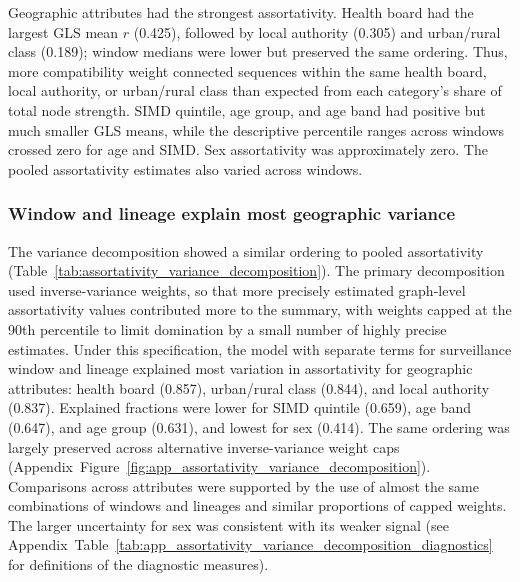 Geographic attributes had the strongest assortativity. Health board had the largest GLS mean $r$ (0.425), followed by local authority (0.305) and urban/rural class (0.189); window medians were lower but preserved the same ordering. Thus, more compatibility weight connected sequences within the same health board, local authority, or urban/rural class than expected from each category's share of total node strength. SIMD quintile, age group, and age band had positive but much smaller GLS means, while the descriptive percentile ranges across windows crossed zero for age and SIMD. Sex assortativity was approximately zero. The pooled assortativity estimates also varied across windows.

\subsubsection*{Window and lineage explain most geographic variance}\label{sec:ch4_variance_decomposition}

The variance decomposition showed a similar ordering to pooled assortativity (Table~\ref{tab:assortativity_variance_decomposition}). The primary decomposition used inverse-variance weights, so that more precisely estimated graph-level assortativity values contributed more to the summary, with weights capped at the 90th percentile to limit domination by a small number of highly precise estimates. Under this specification, the model with separate terms for surveillance window and lineage explained most variation in assortativity for geographic attributes: health board (0.857), urban/rural class (0.844), and local authority (0.837). Explained fractions were lower for SIMD quintile (0.659), age band (0.647), and age group (0.631), and lowest for sex (0.414). The same ordering was largely preserved across alternative inverse-variance weight caps (Appendix~Figure~\ref{fig:app_assortativity_variance_decomposition}). Comparisons across attributes were supported by the use of almost the same combinations of windows and lineages and similar proportions of capped weights. The larger uncertainty for sex was consistent with its weaker signal (see Appendix~Table~\ref{tab:app_assortativity_variance_decomposition_diagnostics} for definitions of the diagnostic measures).




